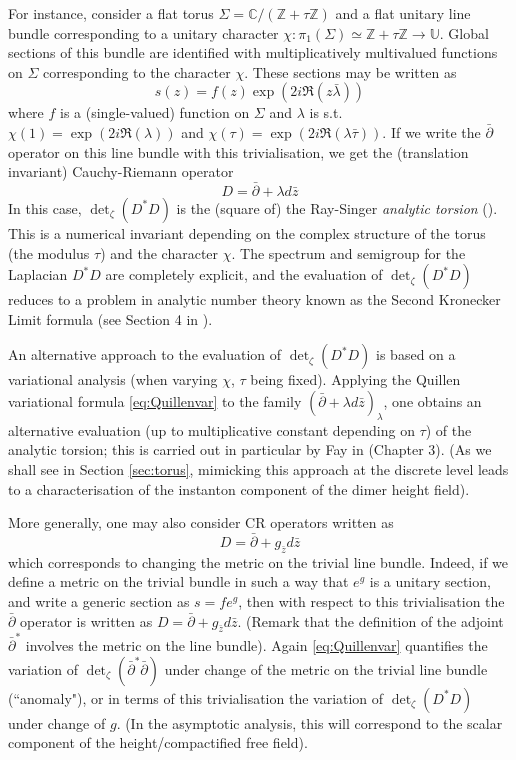 \documentclass[10pt]{article}
\newcommand{\Z}{\mathbb{Z}}
\newcommand{\C}{\mathbb{C}}
\newcommand{\U}{\mathbb{U}}
\newcommand{\dbar}{\bar\partial}
\begin{document}
For instance, consider a flat torus $\Sigma=\C/(\Z+\tau\Z)$ and a flat unitary line bundle corresponding to a unitary character $\chi:\pi_1(\Sigma)\simeq \Z+\tau\Z\rightarrow\U$. Global sections of this bundle are identified with multiplicatively multivalued functions on $\Sigma$ corresponding to the character $\chi$. These sections may be written as 
$$s(z)=f(z)\exp(2i\Re(z\bar\lambda))$$
where $f$ is a (single-valued) function on $\Sigma$ and $\lambda$ is s.t. $\chi(1)=\exp(2i\Re(\lambda))$ and $\chi(\tau)=\exp(2i\Re(\lambda\bar\tau))$. If we write the $\dbar$ operator on this line bundle with this trivialisation, we get the (translation invariant) Cauchy-Riemann operator 
%
$$D=\dbar+\lambda d\bar z$$
%
In this case, $\det_\zeta(D^*D)$ is the (square of) the Ray-Singer {\em analytic torsion} (\cite{RS_analytic}). This is a numerical invariant depending on the complex structure of the torus (the modulus $\tau$) and the character $\chi$. The spectrum and semigroup for the Laplacian $D^*D$ are completely explicit, and the evaluation of $\det_\zeta(D^*D)$ reduces to a problem in analytic number theory known as the Second Kronecker Limit formula (see Section 4 in \cite{RS_analytic}).

An alternative approach to the evaluation of $\det_\zeta(D^*D)$ is based on a variational analysis (when varying $\chi$, $\tau$ being fixed). 
Applying the Quillen variational formula \eqref{eq:Quillenvar} to the family $(\dbar+\lambda d\bar z)_\lambda$, one obtains an alternative evaluation (up to multiplicative constant depending on $\tau$) of the analytic torsion; this is carried out in particular by Fay in \cite{Fay_kernel} (Chapter 3). (As we shall see in Section \ref{sec:torus}, mimicking this approach at the discrete level leads to a characterisation of the instanton component of the dimer height field).

More generally, one may also consider CR operators written as 
$$D=\dbar+g_{\bar z}d\bar z$$
which corresponds to changing the metric on the trivial line bundle. Indeed, if we define a metric on the trivial bundle in such a way that $e^g$ is a unitary section, and write a generic section as $s=fe^g$, then with respect to this trivialisation the $\dbar$ operator is written as $D=\dbar+g_{\bar z}d\bar z$. (Remark that the definition of the adjoint $\dbar^*$ involves the metric on the line bundle). Again \eqref{eq:Quillenvar} quantifies the variation of $\det_\zeta(\dbar^*\dbar)$ under change of the metric on the trivial line bundle (``anomaly"), or in terms of this trivialisation the variation
of $\det_\zeta(D^*D)$ under change of $g$. (In the asymptotic analysis, this will correspond to the scalar component of the height/compactified free field).
\end{document}
